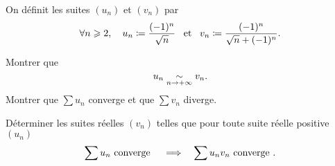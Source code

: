 \documentclass{magnolia}
\begin{document}

On définit les suites $(u_n)$ et $(v_n)$ par
\[\forall n\geqslant 2,\quad u_n \coloneqq \frac{(-1)^n}{\sqrt{n}} \quad\!\text{et}\quad\!
  v_n \coloneqq \frac{(-1)^n}{\sqrt{n}+(-1)^n}.\]
\begin{questions}
\question Montrer que \[u_n \underset{n\rightarrow +\infty}{\sim} v_n.\]
\question Montrer que $\sum u_n$ converge et que $\sum v_n$ diverge.
\end{questions}

Déterminer les suites réelles $(v_n)$ telles que pour toute suite réelle positive $(u_n)$
\[\sum u_n \text{ converge } \quad\Longrightarrow\quad \sum u_n v_n \text{ converge }.\]


\end{document}
